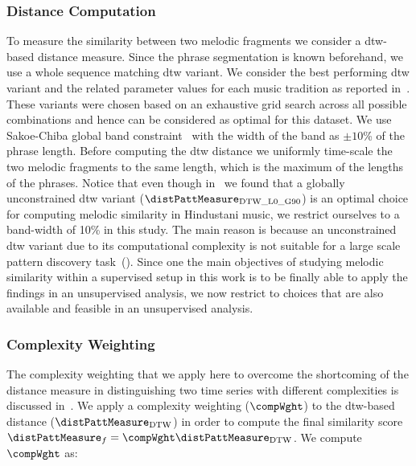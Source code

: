 \subsubsection{Distance Computation}
\label{sec:patterns_improving_similarity_similarity_computation}

To measure the similarity between two melodic fragments we consider a \gls{dtw}-based distance measure. Since the phrase segmentation is known beforehand, we use a whole sequence matching \gls{dtw} variant. We consider the best performing \gls{dtw} variant and the related parameter values for each music tradition as reported in~. These variants were chosen based on an exhaustive grid search across all possible combinations and hence can be considered as optimal for this dataset. We use Sakoe-Chiba global band constraint~\cite{Sakoe78TASLP} with the width of the band as $\pm10$\% of the phrase length. Before computing the \gls{dtw} distance we uniformly time-scale the two melodic fragments to the same length, which is the maximum of the lengths of the phrases. Notice that even though in~ we found that a globally unconstrained \gls{dtw} variant ($\distPattMeasure_{\mathrm{DTW\_L0\_G90}}$) is an optimal choice for computing melodic similarity in Hindustani music, we restrict ourselves to a band-width of 10\% in this study. The main reason is because an unconstrained \gls{dtw} variant due to its computational complexity is not suitable for a large scale pattern discovery task~(). Since one the main objectives of studying melodic similarity within a supervised setup in this work is to be finally able to apply the findings in an unsupervised analysis, we now restrict to choices that are also available and feasible in an unsupervised analysis.


\subsubsection{Complexity Weighting}
\label{sec:patterns_improving_similarity_complexity_invariance_weighting}

The complexity weighting that we apply here to overcome the shortcoming of the distance measure in distinguishing two time series with different complexities is discussed in~\cite{batista2011complexity}. We apply a complexity weighting ($\compWght$) to the \gls{dtw}-based distance ($\distPattMeasure_\mathrm{DTW}$) in order to compute the final similarity score $\distPattMeasure_{f}=\compWght \distPattMeasure_\mathrm{DTW}$. We compute $\compWght$ as:


